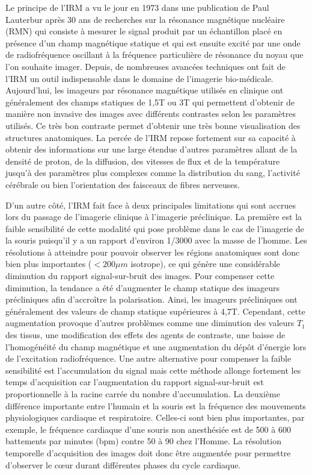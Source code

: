 \medbreak
Le principe de l'IRM a vu le jour en 1973 dans une publication de Paul Lauterbur \cite{lauterbur1973image} après 30 ans de recherches sur la résonance magnétique nucléaire (RMN) qui consiste à mesurer le signal produit par un échantillon placé en présence d'un champ magnétique statique et qui est ensuite excité par une onde de radiofréquence oscillant à la fréquence particulière de résonance du noyau que l'on souhaite imager. Depuis, de nombreuses avancées techniques ont fait de l'IRM un outil indispensable dans le domaine de l'imagerie bio-médicale. Aujourd'hui, les imageurs par résonance magnétique utilisés en clinique ont généralement des champs statiques de 1,5T ou 3T qui permettent d'obtenir de manière non invasive des images avec différents contrastes selon les paramètres utilisés. Ce très bon contraste permet d'obtenir une très bonne visualisation des structures anatomiques. La percée de l'IRM repose fortement sur sa capacité à obtenir des informations sur une large étendue d'autres paramètres allant de la densité de proton, de la diffusion, des vitesses de flux et de la température jusqu'à des paramètres plus complexes comme la distribution du sang, l'activité cérébrale ou bien l'orientation des faisceaux de fibres nerveuses.

\medbreak
D'un autre côté, l'IRM fait face à deux principales limitations qui sont accrues lors du passage de l'imagerie clinique à l'imagerie préclinique. La première est la faible sensibilité de cette modalité qui pose problème dans le cas de l'imagerie de la souris puisqu'il y a un rapport d'environ 1/3000 avec la masse de l'homme. Les résolutions à atteindre pour pouvoir observer les régions anatomiques sont donc bien plus importantes ($< 200 \mu m$ isotrope), ce qui génère une considérable diminution du rapport signal-sur-bruit des images. Pour compenser cette diminution, la tendance a été d'augmenter le champ statique des imageurs précliniques afin d'accroître la polarisation. Ainsi, les imageurs précliniques ont généralement des valeurs de champ statique supérieures à 4,7T. Cependant, cette augmentation provoque d'autres problèmes comme une diminution des valeurs $T_1$ des tissus, une modification des effets des agents de contraste, une baisse de l'homogénéité du champ magnétique et une augmentation du dépôt d'énergie lors de l'excitation radiofréquence. Une autre alternative pour compenser la faible sensibilité est l'accumulation du signal mais cette méthode allonge fortement les temps d'acquisition car l'augmentation du rapport signal-sur-bruit est proportionnelle à la racine carrée du nombre d'accumulation.
La deuxième différence importante entre l'humain et la souris est la fréquence des mouvements physiologiques cardiaque et respiratoire. Celles-ci sont bien plus importantes, par exemple, le fréquence cardiaque d'une souris non anesthésiée est de 500 à 600 battements par minutes (bpm) contre 50 à 90 chez l'Homme. La résolution temporelle d'acquisition des images doit donc être augmentée pour permettre d'observer le cœur durant différentes phases du cycle cardiaque.

